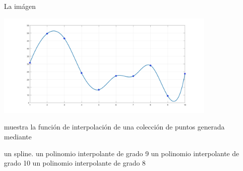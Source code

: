 \begin{pregunta}
\begin{cuerpo}
La im\'agen
\begin{center}
\includegraphics[width=0.8\textwidth]{./img/p24.jpg}
\end{center}
muestra la funci\'on de interpolaci\'on de una colecci\'on de puntos generada mediante
\end{cuerpo}

\begin{alternativas}
{un spline.}
{un polinomio interpolante de grado 9}
{un polinomio interpolante de grado 10}
{un polinomio interpolante de grado 8}
\end{alternativas}
\justificacion{0cm}
\end{pregunta}